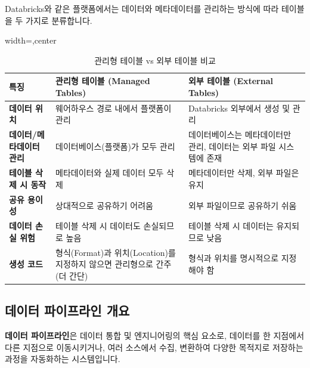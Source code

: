 \documentclass[11pt,a4paper]{article}
\begin{document}
Databricks와 같은 플랫폼에서는 데이터와 메타데이터를 관리하는 방식에 따라 테이블을 두 가지로 분류합니다.

\begin{table}[htbp]
\centering
\caption{관리형 테이블 vs 외부 테이블 비교}
\label{tab:managed_vs_external_tables}
\begin{adjustbox}{width=\textwidth,center}
\begin{tabular}{lll}
\toprule
\textbf{특징} & \textbf{관리형 테이블 (Managed Tables)} & \textbf{외부 테이블 (External Tables)} \\
\midrule
\textbf{데이터 위치} & 웨어하우스 경로 내에서 플랫폼이 관리 & Databricks 외부에서 생성 및 관리 \\
\textbf{데이터/메타데이터 관리} & 데이터베이스(플랫폼)가 모두 관리 & 데이터베이스는 메타데이터만 관리, 데이터는 외부 파일 시스템에 존재 \\
\textbf{테이블 삭제 시 동작} & 메타데이터와 실제 데이터 모두 삭제 & 메타데이터만 삭제, 외부 파일은 유지 \\
\textbf{공유 용이성} & 상대적으로 공유하기 어려움 & 외부 파일이므로 공유하기 쉬움 \\
\textbf{데이터 손실 위험} & 테이블 삭제 시 데이터도 손실되므로 높음 & 테이블 삭제 시 데이터는 유지되므로 낮음 \\
\textbf{생성 코드} & 형식(Format)과 위치(Location)를 지정하지 않으면 관리형으로 간주 (더 간단) & 형식과 위치를 명시적으로 지정해야 함 \\
\bottomrule
\end{tabular}
\end{adjustbox}
\end{table}

\subsection{데이터 파이프라인 개요}

\begin{conceptbox}
\textbf{데이터 파이프라인}은 데이터 통합 및 엔지니어링의 핵심 요소로, 데이터를 한 지점에서 다른 지점으로 이동시키거나, 여러 소스에서 수집, 변환하여 다양한 목적지로 저장하는 과정을 자동화하는 시스템입니다.
\end{conceptbox}
\end{document}
